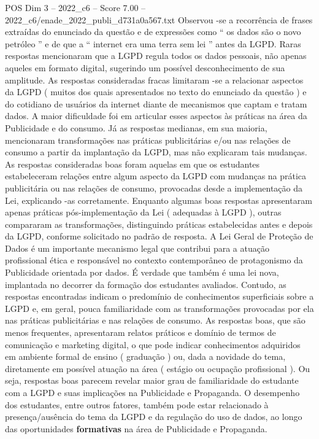 \begin{textsample}{POS Dim 3 – 2022\_c6 – Score 7.00 – 2022\_c6/enade\_2022\_publi\_d731a0a567.txt}
Observou -se a recorrência de frases extraídas do enunciado da questão e de expressões como “ os dados são o novo petróleo ” e de que a “ internet era uma terra sem lei ” antes da LGPD.
Raras respostas mencionaram que a LGPD regula todos os dados pessoais, não apenas aqueles em formato digital, sugerindo um possível desconhecimento de sua amplitude.
As respostas consideradas fracas limitaram -se a relacionar aspectos da LGPD ( muitos dos quais apresentados no texto do enunciado da questão ) e do cotidiano de usuários da internet diante de mecanismos que captam e tratam dados.
A maior dificuldade foi em articular esses aspectos às práticas na área da Publicidade e do consumo.
Já as respostas medianas, em sua maioria, mencionaram transformações nas práticas publicitárias e/ou nas relações de consumo a partir da implantação da LGPD, mas não explicaram tais mudanças.
As respostas consideradas boas foram aquelas em que os estudantes estabeleceram relações entre algum aspecto da LGPD com mudanças na prática publicitária ou nas relações de consumo, provocadas desde a implementação da Lei, explicando -as corretamente.
Enquanto algumas boas respostas apresentaram apenas práticas pós-implementação da Lei ( adequadas à LGPD ), outras compararam as transformações, distinguindo práticas estabelecidas antes e depois da LGPD, conforme solicitado no padrão de resposta.
A Lei Geral de Proteção de Dados é um importante mecanismo legal que contribui para a atuação profissional ética e responsável no contexto contemporâneo de protagonismo da Publicidade orientada por dados.
É verdade que também é uma lei nova, implantada no decorrer da formação dos estudantes avaliados.
Contudo, as respostas encontradas indicam o predomínio de conhecimentos superficiais sobre a LGPD e, em geral, pouca familiaridade com as transformações provocadas por ela nas práticas publicitárias e nas relações de consumo.
As respostas boas, que são menos frequentes, apresentaram relatos práticos e domínio de termos de comunicação e marketing digital, o que pode indicar conhecimentos adquiridos em ambiente formal de ensino ( graduação ) ou, dada a novidade do tema, diretamente em possível atuação na área ( estágio ou ocupação profissional ).
Ou seja, respostas boas parecem revelar maior grau de familiaridade do estudante com a LGPD e suas implicações na Publicidade e Propaganda.
O desempenho dos estudantes, entre outros fatores, também pode estar relacionado à presença/ausência do tema da LGPD e da regulação do uso de dados, ao longo das oportunidades \textbf{formativas} na área de Publicidade e Propaganda.

\end{textsample}
